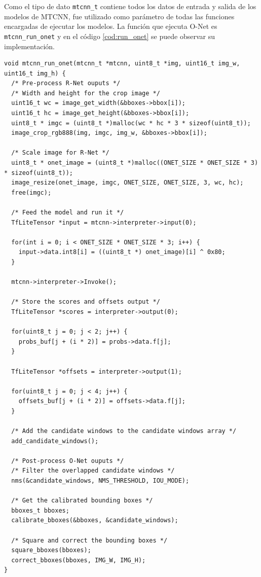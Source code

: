 Como el tipo de dato \texttt{mtcnn\_t} contiene todos los datos de entrada y salida de los modelos de MTCNN, fue utilizado como parámetro de todas las funciones encargadas de ejecutar los modelos. La función que ejecuta O-Net es \texttt{mtcnn\_run\_onet} y en el código \ref{cod:run_onet} se puede observar su implementación.

\begin{lstlisting}[label=cod:run_onet,caption=Función mtcnn\_run\_onet.]
void mtcnn_run_onet(mtcnn_t *mtcnn, uint8_t *img, uint16_t img_w, uint16_t img_h) {
  /* Pre-process R-Net ouputs */
  /* Width and height for the crop image */
  uint16_t wc = image_get_width(&bboxes->bbox[i]);
  uint16_t hc = image_get_height(&bboxes->bbox[i]);
  uint8_t * imgc = (uint8_t *)malloc(wc * hc * 3 * sizeof(uint8_t));
  image_crop_rgb888(img, imgc, img_w, &bboxes->bbox[i]);
  
  /* Scale image for R-Net */
  uint8_t * onet_image = (uint8_t *)malloc((ONET_SIZE * ONET_SIZE * 3) * sizeof(uint8_t));
  image_resize(onet_image, imgc, ONET_SIZE, ONET_SIZE, 3, wc, hc);
  free(imgc);
  
  /* Feed the model and run it */
  TfLiteTensor *input = mtcnn->interpreter->input(0);
    
  for(int i = 0; i < ONET_SIZE * ONET_SIZE * 3; i++) {
    input->data.int8[i] = ((uint8_t *) onet_image)[i] ^ 0x80;
  }
  
  mtcnn->interpreter->Invoke();
  
  /* Store the scores and offsets output */
  TfLiteTensor *scores = interpreter->output(0);
  
  for(uint8_t j = 0; j < 2; j++) {
    probs_buf[j + (i * 2)] = probs->data.f[j];
  }

  TfLiteTensor *offsets = interpreter->output(1);

  for(uint8_t j = 0; j < 4; j++) {
    offsets_buf[j + (i * 2)] = offsets->data.f[j];
  }
  
  /* Add the candidate windows to the candidate windows array */
  add_candidate_windows();
  
  /* Post-process O-Net ouputs */
  /* Filter the overlapped candidate windows */
  nms(&candidate_windows, NMS_THRESHOLD, IOU_MODE);

  /* Get the calibrated bounding boxes */  
  bboxes_t bboxes;  
  calibrate_bboxes(&bboxes, &candidate_windows);
  
  /* Square and correct the bounding boxes */
  square_bboxes(bboxes);
  correct_bboxes(bboxes, IMG_W, IMG_H);
}
\end{lstlisting}


